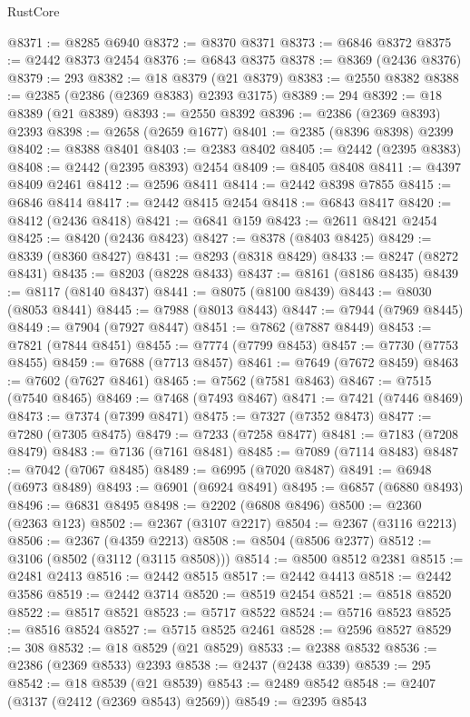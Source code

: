 \begin{lexlean}{RustCore}
\begin{coremodule}
@8371 := @8285 @6940
@8372 := @8370 @8371
@8373 := @6846 @8372
@8375 := @2442 @8373 @2454
@8376 := @6843 @8375
@8378 := @8369 (@2436 @8376)
@8379 := 293
@8382 := @18 @8379 (@21 @8379)
@8383 := @2550 @8382
@8388 := @2385 (@2386 (@2369 @8383) @2393 @3175)
@8389 := 294
@8392 := @18 @8389 (@21 @8389)
@8393 := @2550 @8392
@8396 := @2386 (@2369 @8393) @2393
@8398 := @2658 (@2659 @1677)
@8401 := @2385 (@8396 @8398) @2399
@8402 := @8388 @8401
@8403 := @2383 @8402
@8405 := @2442 (@2395 @8383)
@8408 := @2442 (@2395 @8393) @2454
@8409 := @8405 @8408
@8411 := @4397 @8409 @2461
@8412 := @2596 @8411
@8414 := @2442 @8398 @7855
@8415 := @6846 @8414
@8417 := @2442 @8415 @2454
@8418 := @6843 @8417
@8420 := @8412 (@2436 @8418)
@8421 := @6841 @159
@8423 := @2611 @8421 @2454
@8425 := @8420 (@2436 @8423)
@8427 := @8378 (@8403 @8425)
@8429 := @8339 (@8360 @8427)
@8431 := @8293 (@8318 @8429)
@8433 := @8247 (@8272 @8431)
@8435 := @8203 (@8228 @8433)
@8437 := @8161 (@8186 @8435)
@8439 := @8117 (@8140 @8437)
@8441 := @8075 (@8100 @8439)
@8443 := @8030 (@8053 @8441)
@8445 := @7988 (@8013 @8443)
@8447 := @7944 (@7969 @8445)
@8449 := @7904 (@7927 @8447)
@8451 := @7862 (@7887 @8449)
@8453 := @7821 (@7844 @8451)
@8455 := @7774 (@7799 @8453)
@8457 := @7730 (@7753 @8455)
@8459 := @7688 (@7713 @8457)
@8461 := @7649 (@7672 @8459)
@8463 := @7602 (@7627 @8461)
@8465 := @7562 (@7581 @8463)
@8467 := @7515 (@7540 @8465)
@8469 := @7468 (@7493 @8467)
@8471 := @7421 (@7446 @8469)
@8473 := @7374 (@7399 @8471)
@8475 := @7327 (@7352 @8473)
@8477 := @7280 (@7305 @8475)
@8479 := @7233 (@7258 @8477)
@8481 := @7183 (@7208 @8479)
@8483 := @7136 (@7161 @8481)
@8485 := @7089 (@7114 @8483)
@8487 := @7042 (@7067 @8485)
@8489 := @6995 (@7020 @8487)
@8491 := @6948 (@6973 @8489)
@8493 := @6901 (@6924 @8491)
@8495 := @6857 (@6880 @8493)
@8496 := @6831 @8495
@8498 := @2202 (@6808 @8496)
@8500 := @2360 (@2363 @123)
@8502 := @2367 (@3107 @2217)
@8504 := @2367 (@3116 @2213)
@8506 := @2367 (@4359 @2213)
@8508 := @8504 (@8506 @2377)
@8512 := @3106 (@8502 (@3112 (@3115 @8508)))
@8514 := @8500 @8512 @2381
@8515 := @2481 @2413
@8516 := @2442 @8515
@8517 := @2442 @4413
@8518 := @2442 @3586
@8519 := @2442 @3714
@8520 := @8519 @2454
@8521 := @8518 @8520
@8522 := @8517 @8521
@8523 := @5717 @8522
@8524 := @5716 @8523
@8525 := @8516 @8524
@8527 := @5715 @8525 @2461
@8528 := @2596 @8527
@8529 := 308
@8532 := @18 @8529 (@21 @8529)
@8533 := @2388 @8532
@8536 := @2386 (@2369 @8533) @2393
@8538 := @2437 (@2438 @339)
@8539 := 295
@8542 := @18 @8539 (@21 @8539)
@8543 := @2489 @8542
@8548 := @2407 (@3137 (@2412 (@2369 @8543) @2569))
@8549 := @2395 @8543

\end{coremodule}
\end{lexlean}
